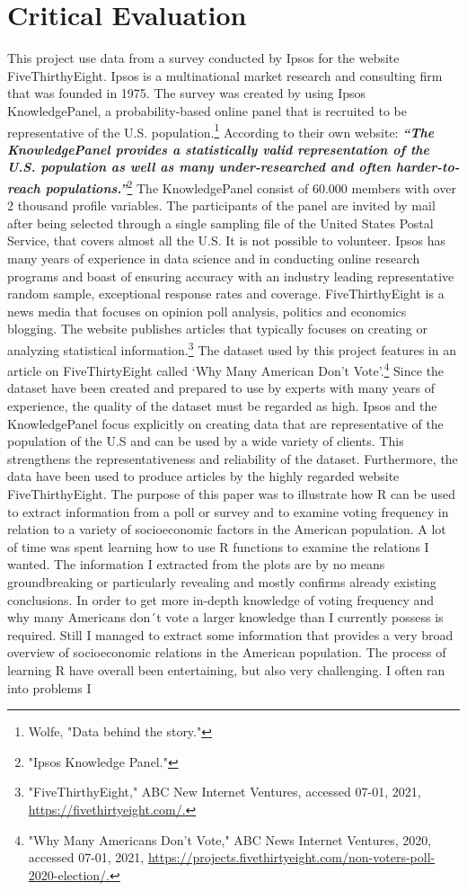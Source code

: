 \documentclass{article}
\begin{document}
\section{Critical Evaluation}
This project use data from a survey conducted by Ipsos for the website FiveThirthyEight. Ipsos is a multinational market research and consulting firm that was founded in 1975. The survey was created by using Ipsos KnowledgePanel, a probability-based online panel that is recruited to be representative of the U.S. population.\footnote{  Wolfe, "Data behind the story."}  According to their own website: \textbf{\textit{“The KnowledgePanel provides a statistically valid representation of the U.S. population as well as many under-researched and often harder-to-reach populations.”}}\footnote{  "Ipsos Knowledge Panel."}  The KnowledgePanel consist of 60.000 members with over 2 thousand profile variables. The participants of the panel are invited by mail after being selected through a single sampling file of the United States Postal Service, that covers almost all the U.S. It is not possible to volunteer. Ipsos has many years of experience in data science and in conducting online research programs and boast of ensuring accuracy with an industry leading representative random sample, exceptional response rates and coverage. FiveThirthyEight is a news media that focuses on opinion poll analysis, politics and economics blogging. The website publishes articles that typically focuses on creating or analyzing statistical information.\footnote{  "FiveThirthyEight," ABC New Internet Ventures, accessed 07-01, 2021, \url{https://fivethirtyeight.com/.}}  The dataset used by this project features in an article on FiveThirtyEight called ‘Why Many American Don’t Vote’.\footnote{  "Why Many Americans Don't Vote," ABC News Internet Ventures, 2020, accessed 07-01, 2021, \url{https://projects.fivethirtyeight.com/non-voters-poll-2020-election/.}}   Since the dataset have been created and prepared to use by experts with many years of experience, the quality of the dataset must be regarded as high. Ipsos and the KnowledgePanel focus explicitly on creating data that are representative of the population of the U.S and can be used by a wide variety of clients. This strengthens the representativeness and reliability of the dataset. Furthermore, the data have been used to produce articles by the highly regarded website FiveThirthyEight. The purpose of this paper was to illustrate how R can be used to extract information from a poll or survey and to examine voting frequency in relation to a variety of socioeconomic factors in the American population. A lot of time was spent learning how to use R functions to examine the relations I wanted. The information I extracted from the plots are by no means groundbreaking or particularly revealing and mostly confirms already existing conclusions. In order to get more in-depth knowledge of voting frequency and why many Americans don´t vote a larger knowledge than I currently possess is required. Still I managed to extract some information that provides a very broad overview of socioeconomic relations in the American population. The process of learning R have overall been entertaining, but also very challenging. I often ran into problems I 
\end{document}
